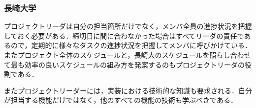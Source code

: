 \subsubsection{長崎大学}
\par プロジェクトリーダは自分の担当箇所だけでなく，メンバ全員の進捗状況を把握しておく必要がある．締切日に間に合わなかった場合はすべてリーダの責任であるので，定期的に様々なタスクの進捗状況を把握してメンバに呼びかけている．またプロジェクト全体のスケジュールと，長崎大のスケジュールを照らし合わせて最も効率の良いスケジュールの組み方を発案するのもプロジェクトリーダの役割である．
\par またプロジェクトリーダーには，実装における技術的な知識も要求される．自分が担当する機能だけではなく，他のすべての機能の技術も学ぶべきである．
